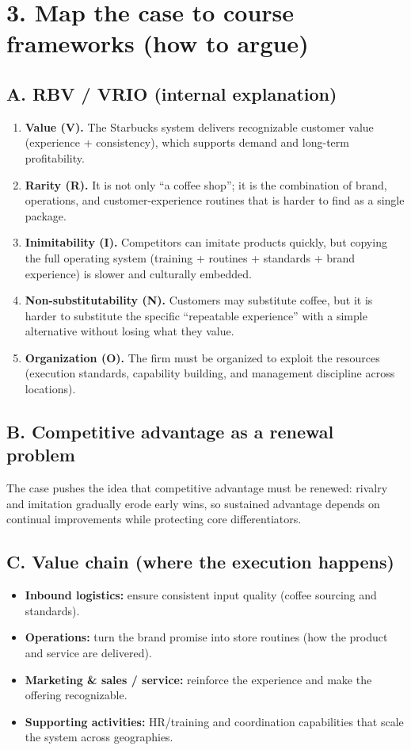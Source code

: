 \documentclass[10pt,a4paper]{article}
\begin{document}
\section*{\color{eublue}3. Map the case to course frameworks (how to argue)}
\subsection*{\color{eublue}A. RBV / VRIO (internal explanation)}
\begin{enumerate}
  \item \textbf{Value (V).} The Starbucks system delivers recognizable customer value (experience + consistency), which supports demand and long-term profitability.
  \item \textbf{Rarity (R).} It is not only ``a coffee shop''; it is the combination of brand, operations, and customer-experience routines that is harder to find as a single package.
  \item \textbf{Inimitability (I).} Competitors can imitate products quickly, but copying the full operating system (training + routines + standards + brand experience) is slower and culturally embedded.
  \item \textbf{Non-substitutability (N).} Customers may substitute coffee, but it is harder to substitute the specific ``repeatable experience'' with a simple alternative without losing what they value.
  \item \textbf{Organization (O).} The firm must be organized to exploit the resources (execution standards, capability building, and management discipline across locations).
\end{enumerate}

\subsection*{\color{eublue}B. Competitive advantage as a renewal problem}
The case pushes the idea that competitive advantage must be renewed: rivalry and imitation gradually erode early wins, so sustained advantage depends on continual improvements while protecting core differentiators.

\subsection*{\color{eublue}C. Value chain (where the execution happens)}
\begin{itemize}
  \item \textbf{Inbound logistics:} ensure consistent input quality (coffee sourcing and standards).
  \item \textbf{Operations:} turn the brand promise into store routines (how the product and service are delivered).
  \item \textbf{Marketing \& sales / service:} reinforce the experience and make the offering recognizable.
  \item \textbf{Supporting activities:} HR/training and coordination capabilities that scale the system across geographies.
\end{itemize}
\end{document}
